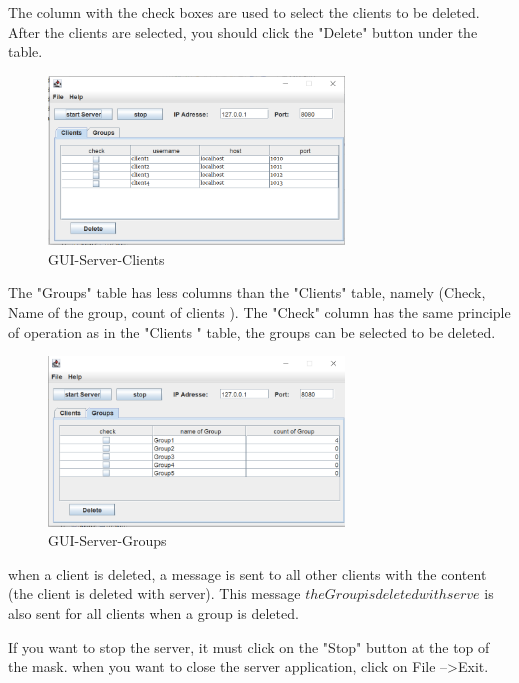 \noindent
The column with the check boxes are used to select the clients to be deleted.
After the clients are selected, you should click the "Delete" button under the table.

\begin{figure}
    \centering
    \includegraphics[width=0.7\textwidth]{gfx/GUI_Server_Clients}
    \caption{GUI-Server-Clients}
    \label{fig:gui-server-clients}
\end{figure}

\noindent
The "Groups" table has less columns than the "Clients" table, namely (Check, Name of the group,
count of clients ).
The "Check" column has the same principle of operation as in the "Clients " table, the groups
can be selected to be deleted.

\begin{figure}
    \centering
    \includegraphics[width=0.7\textwidth]{gfx/GUI_Server_Groups}
    \caption{GUI-Server-Groups}
    \label{fig:gui-server-groups}
\end{figure}

\noindent
when a client is deleted, a message is sent to all other clients with the content
(the client is deleted with server).
This message \(the Group is deleted with serve\) is also sent for all clients when a group is deleted.
\medskip

\noindent
If you want to stop the server, it must click on the "Stop" button at the top of the mask.
when you want to close the server application, click on File -->Exit.

